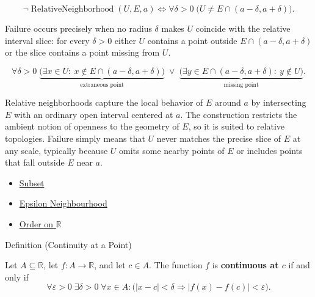 \begin{remark*}
\[
\neg \operatorname{RelativeNeighborhood}(U,E,a)
\Longleftrightarrow
\forall \delta > 0\;
\bigl(U \ne E \cap (a-\delta, a+\delta)\bigr).
\]
\end{remark*}

\begin{remark*}
Failure occurs precisely when no radius $\delta$ makes $U$ coincide with the relative interval slice: for every $\delta > 0$ either $U$ contains a point outside $E \cap (a-\delta,a+\delta)$ or the slice contains a point missing from $U$.
\end{remark*}

\begin{remark*}
\[
\forall \delta > 0\;
\underbrace{\bigl(\exists x \in U:\ x \notin E \cap (a-\delta,a+\delta)\bigr)}_{\text{extraneous point}}
\;\lor\;
\underbrace{\bigl(\exists y \in E \cap (a-\delta,a+\delta):\ y \notin U\bigr)}_{\text{missing point}}.
\]
\end{remark*}

\begin{remark*}[Interpretation]
Relative neighborhoods capture the local behavior of $E$ around $a$ by intersecting $E$ with an ordinary open interval centered at $a$. The construction restricts the ambient notion of openness to the geometry of $E$, so it is suited to relative topologies. Failure simply means that $U$ never matches the precise slice of $E$ at any scale, typically because $U$ omits some nearby points of $E$ or includes points that fall outside $E$ near $a$.
\end{remark*}

\begin{dependencies}
\begin{itemize}
  \item \hyperref[def:subset]{Subset}
  \item \hyperref[def:epsilon-neighbourhood]{Epsilon Neighbourhood}
  \item \hyperref[def:order-on-r]{Order on $\mathbb{R}$}
\end{itemize}
\end{dependencies}

\begin{definitionbox}{Definition (Continuity at a Point)}
\begin{definition}
\label{def:continuous-at-point}
Let $A \subseteq \mathbb{R}$, let $f : A \to \mathbb{R}$, and let $c \in A$. The function $f$ is \textbf{continuous at $c$} if and only if
\[
\forall \varepsilon > 0 \;\exists \delta > 0 \;\forall x \in A :
\bigl(|x-c| < \delta \Rightarrow |f(x)-f(c)| < \varepsilon\bigr).
\]
\end{definition}
\end{definitionbox}

